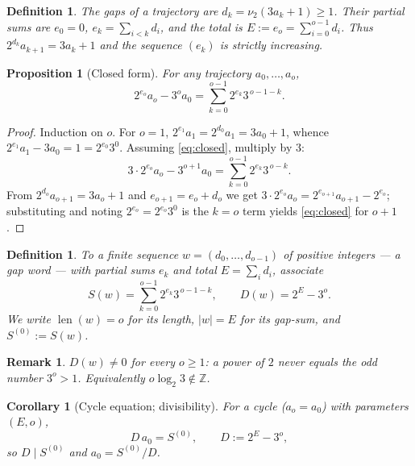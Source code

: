 \documentclass[11pt,a4paper]{article}
\theoremstyle{bourbaki}
\newtheorem{prop}[thm]{Proposition}
\newtheorem{cor}[thm]{Corollary}
\theoremstyle{bourbakidef}
\newtheorem{defn}[thm]{Definition}
\newtheorem{rem}[thm]{Remark}
\newcommand{\Z}{\mathbb{Z}}
\DeclareMathOperator{\len}{len}
\begin{document}
\begin{defn}\label{def:gaps}
The \emph{gaps} of a trajectory are $d_{k}=\nu_{2}(3a_{k}+1)\ge 1$. Their partial sums
are $e_{0}=0$, $e_{k}=\sum_{i<k}d_{i}$, and the \emph{total} is
$E:=e_{o}=\sum_{i=0}^{o-1}d_{i}$. Thus $2^{d_{k}}a_{k+1}=3a_{k}+1$ and the sequence
$(e_{k})$ is strictly increasing.
\end{defn}

\begin{prop}[Closed form]\label{prop:closed}
For any trajectory $a_{0},\dots,a_{o}$,
\begin{equation}\label{eq:closed}
   2^{e_{o}}a_{o}-3^{o}a_{0}=\sum_{k=0}^{o-1}2^{e_{k}}3^{\,o-1-k}.
\end{equation}
\end{prop}

\begin{proof}
Induction on $o$. For $o=1$, $2^{e_{1}}a_{1}=2^{d_{0}}a_{1}=3a_{0}+1$, whence
$2^{e_{1}}a_{1}-3a_{0}=1=2^{e_{0}}3^{0}$. Assuming \eqref{eq:closed}, multiply by $3$:
\[
   3\cdot 2^{e_{o}}a_{o}-3^{o+1}a_{0}=\sum_{k=0}^{o-1}2^{e_{k}}3^{\,o-k}.
\]
From $2^{d_{o}}a_{o+1}=3a_{o}+1$ and $e_{o+1}=e_{o}+d_{o}$ we get
$3\cdot 2^{e_{o}}a_{o}=2^{e_{o+1}}a_{o+1}-2^{e_{o}}$; substituting and noting
$2^{e_{o}}=2^{e_{o}}3^{0}$ is the $k=o$ term yields \eqref{eq:closed} for $o+1$.
\end{proof}

\begin{defn}\label{def:S}
To a finite sequence $w=(d_{0},\dots,d_{o-1})$ of positive integers --- a \emph{gap word}
--- with partial sums $e_{k}$ and total $E=\sum_{i}d_{i}$, associate
\[
   S(w)=\sum_{k=0}^{o-1}2^{e_{k}}3^{\,o-1-k},\qquad D(w)=2^{E}-3^{o}.
\]
We write $\len(w)=o$ for its length, $\lvert w\rvert=E$ for its gap-sum, and $S^{(0)}:=S(w)$.
\end{defn}

\begin{rem}\label{rem:Dne0}
$D(w)\ne 0$ for every $o\ge 1$: a power of $2$ never equals the odd number $3^{o}>1$.
Equivalently $o\log_{2}3\notin\Z$.
\end{rem}

\begin{cor}[Cycle equation; divisibility]\label{cor:cycleeq}
For a cycle ($a_{o}=a_{0}$) with parameters $(E,o)$,
\begin{equation}\label{eq:cycleeq}
   D\,a_{0}=S^{(0)},\qquad D:=2^{E}-3^{o},
\end{equation}
so $D\mid S^{(0)}$ and $a_{0}=S^{(0)}/D$.
\end{cor}
\end{document}
